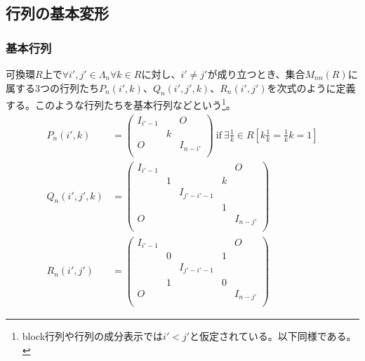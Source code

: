 \documentclass[dvipdfmx]{jsarticle}
\begin{document}
\subsection{行列の基本変形}%
\subsubsection{基本行列}%
\begin{dfn}
可換環$R$上で$\forall i',j' \in \varLambda_{n}\forall k \in R$に対し、$i' \neq j'$が成り立つとき、集合$M_{nn}(R)$に属する3つの行列たち$P_{n}\left( i',k \right)$、$Q_{n}\left( i',j',k \right)$、$R_{n}\left( i',j' \right)$を次式のように定義する。このような行列たちを基本行列などという\footnote{block行列や行列の成分表示では$i' < j'$と仮定されている。以下同様である。}。
\begin{align*}
P_{n}\left( i',k \right) &= \begin{pmatrix}
I_{i' - 1} & \  & O \\
\  & k & \  \\
O & \  & I_{n - i'} \\
\end{pmatrix}\ \mathrm{if}\ \exists\frac{1}{k} \in R\left[ k\frac{1}{k} = \frac{1}{k}k = 1 \right]\\
Q_{n}\left( i',j',k \right) &= \begin{pmatrix}
I_{i' - 1} & \  & \  & \  & O \\
\  & 1 & \  & k & \  \\
\  & \  & I_{j' - i' - 1} & \  & \  \\
\  & \  & \  & 1 & \  \\
O & \  & \  & \  & I_{n - j'} \\
\end{pmatrix}\\
R_{n}\left( i',j' \right) &= \begin{pmatrix}
I_{i' - 1} & \  & \  & \  & O \\
\  & 0 & \  & 1 & \  \\
\  & \  & I_{j' - i' - 1} & \  & \  \\
\  & 1 & \  & 0 & \  \\
O & \  & \  & \  & I_{n - j'} \\
\end{pmatrix}
\end{align*}
\end{dfn}
\end{document}
